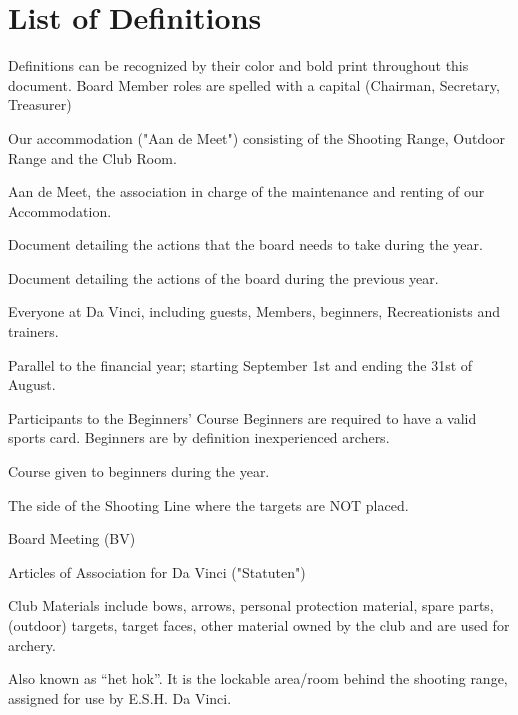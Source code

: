 \documentclass[a4paper]{article}
\newcommand{\Abr}{Administrative Regulations} %
\newcommand{\Asta}{Bylaws} %
\newcommand{\Ajv}{Annual Report} %
\begin{document}
\newpage

\tableofcontents
\pagebreak
\section*{List of Definitions}
{\g Definitions can be recognized by their color and bold print throughout this document. Board Member roles are spelled with a capital (Chairman, Secretary, Treasurer)}

\bigskip

\begin{description}[font=\sffamily\bfseries, leftmargin=1cm, style=nextline]
\item[{\defi Accommodation}] Our accommodation ("Aan de Meet") consisting of the Shooting Range, Outdoor Range and the { Club Room}.
    \item[{\defi ADM}]
    Aan de Meet, the association in charge of the maintenance and renting of our { Accommodation}.
\item[{\defi \Abr}] Document detailing the actions that the board needs to take during the year.
\item[{\defi \Ajv}] Document detailing the actions of the board during the previous year.
\item[\defi Archer] Everyone at Da Vinci, including { guests}, { Members}, { beginners}, { Recreationists} and trainers.
    \item[{\defi Association Year}]
    Parallel to the financial year; starting September 1st and ending the 31st of August. 
\item[{\defi Beginner}]
Participants to the { Beginners' Course} Beginners are required to have a valid sports card. Beginners are by definition { inexperienced} archers.
\item[{\defi Beginners' Course}] Course given to beginners during the year.
    \item[{\defi “Behind the line”}]
    The side of the Shooting Line where the targets are NOT placed. 
  \item[{\defi BM}]
    Board Meeting (BV)
\item[{\defi \Asta}] Articles of Association for Da Vinci ("Statuten")
\item[\defi Club Materials] Club Materials include bows, arrows, personal protection material, spare parts, (outdoor) targets, target faces, other material owned by the club and are used for archery.
\item[{\defi Club Room}] Also known as “het hok”. It is the lockable area/room behind the shooting range, assigned for use by E.S.H. Da Vinci.

\end{description}
\end{document}
